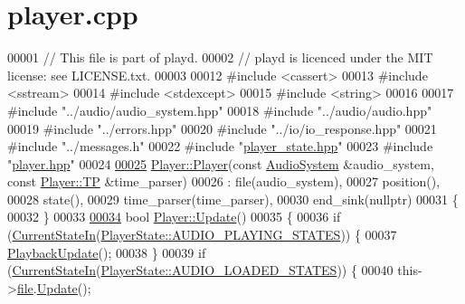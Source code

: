 \hypertarget{player_8cpp_source}{\section{player.\+cpp}
\label{player_8cpp_source}
}

\begin{DoxyCode}
00001 \textcolor{comment}{// This file is part of playd.}
00002 \textcolor{comment}{// playd is licenced under the MIT license: see LICENSE.txt.}
00003 
00012 \textcolor{preprocessor}{#include <cassert>}
00013 \textcolor{preprocessor}{#include <sstream>}
00014 \textcolor{preprocessor}{#include <stdexcept>}
00015 \textcolor{preprocessor}{#include <string>}
00016 
00017 \textcolor{preprocessor}{#include "../audio/audio\_system.hpp"}
00018 \textcolor{preprocessor}{#include "../audio/audio.hpp"}
00019 \textcolor{preprocessor}{#include "../errors.hpp"}
00020 \textcolor{preprocessor}{#include "../io/io\_response.hpp"}
00021 \textcolor{preprocessor}{#include "../messages.h"}
00022 \textcolor{preprocessor}{#include "\hyperlink{player__state_8hpp}{player\_state.hpp}"}
00023 \textcolor{preprocessor}{#include "\hyperlink{player_8hpp}{player.hpp}"}
00024 
\hypertarget{player_8cpp_source_l00025}{}\hyperlink{classPlayer_a19fcaf8a2864565adcde9b955a890431}{00025} \hyperlink{classPlayer_a19fcaf8a2864565adcde9b955a890431}{Player::Player}(\textcolor{keyword}{const} \hyperlink{classAudioSystem}{AudioSystem} &audio\_system, \textcolor{keyword}{const} 
      \hyperlink{classTimeParser}{Player::TP} &time\_parser)
00026     : file(audio\_system),
00027       position(),
00028       state(),
00029       time\_parser(time\_parser),
00030       end\_sink(nullptr)
00031 \{
00032 \}
00033 
\hypertarget{player_8cpp_source_l00034}{}\hyperlink{classPlayer_a91f887a024035be5030aa4b3384705fa}{00034} \textcolor{keywordtype}{bool} \hyperlink{classPlayer_a91f887a024035be5030aa4b3384705fa}{Player::Update}()
00035 \{
00036     \textcolor{keywordflow}{if} (\hyperlink{classPlayer_aa56e60cd7b83a4aa7ebda1e6ec054f4d}{CurrentStateIn}(\hyperlink{classPlayerState_aa5e7203a1fa44e8bceffe65b6ad2c554}{PlayerState::AUDIO\_PLAYING\_STATES})) \{
00037         \hyperlink{classPlayer_affe746dc330ee92b64e2093c84858625}{PlaybackUpdate}();
00038     \}
00039     \textcolor{keywordflow}{if} (\hyperlink{classPlayer_aa56e60cd7b83a4aa7ebda1e6ec054f4d}{CurrentStateIn}(\hyperlink{classPlayerState_a850bf90685a377001cfc46808cf017a4}{PlayerState::AUDIO\_LOADED\_STATES})) \{
00040         this->\hyperlink{classPlayer_abcb788a7830c40ae5ba2a219c5341a58}{file}.\hyperlink{classPlayerFile_afe0b43a6980e548a6faa87f84d22d65b}{Update}();

\end{DoxyCode}
